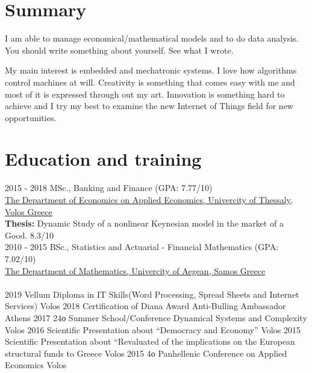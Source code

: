 \documentclass[letterpaper]{engineer_cv} %
\begin{document}
	\makeprofile %


	\section{Summary}

    I am able to manage economical/mathematical models and to do data analysis. You should write something about yourself. See what I wrote.

	My main interest is embedded and mechatronic systems. I love how algorithms control machines at will. Creativity is something that comes easy with me and most of it is expressed through out my art. Innovation is something hard to achieve and I try my best to examine the new Internet of Things field for new opportunities.


	\section{Education and training}

	\begin{longList} %
		\longListItem
			{2015 - 2018}
			{}
			{MSc., Banking and Finance \textnormal{(GPA: 7.77/10)}}
			{\\\href{https://www.econ.uth.gr/}{The Department of Economics on Applied Economics, Univercity of Thessaly, Volos Greece}\\{{\bf Thesis:} Dynamic Study of a nonlinear Keynesian model in the market of a Good. 8.3/10}}
			{}
			{}
			\\
		\longListItem
			{2010 - 2015}
			{}
			{BSc., Statistics and Actuarial - Financial Mathematics \textnormal{(GPA: 7.02/10)}}
			{\\\href{https://www.math.aegean.gr/}{The Department of Mathematics, Univercity of Aegean, Samos Greece}\\}
			{}
			{}
			\\
		\longListItem
			{2019}
			{}
			{Vellum Diploma in IT Skills(Word Processing, Spread Sheets and Internet Services)}
			{Volos}
			{}
			{}
		\longListItem
			{2018}
			{}
			{Certification of Diana Award Anti-Bulling Ambassador}
			{Athens}
			{}
			{}
		\longListItem
			{2017}
			{}
			{24ο Summer School/Conference Dynamical Systems and Complexity}
			{Volos}
			{}
			{}
		\longListItem
			{2016}
			{}
			{Scientific Presentation about “Democracy and Economy”}
			{Volos}
			{}
			{}
		\longListItem
			{2015}
			{}
			{Scientific Presentation about “Revaluated of the implications on the European structural funds to Greece}
			{Volos}
			{}
			{}
		\longListItem
			{2015}
			{}
			{4ο Panhellenic Conference on Applied Economics}
			{Volos}
			{}
			{}
	\end{longList}
\end{document}
